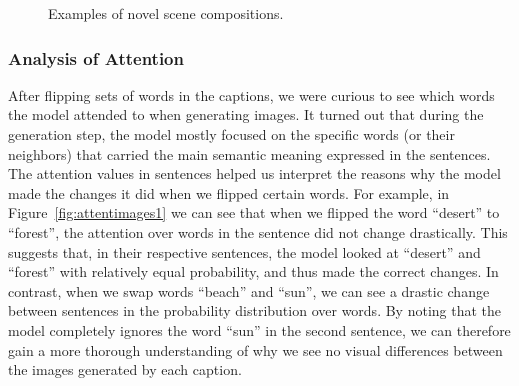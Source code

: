 \documentclass{article} %
\begin{document}
\begin{figure}[!h]
\captionsetup[subfigure]{labelformat=empty}
\begin{center}
\quad
%
\quad
%
\quad
%
\quad
%
\end{center}
\caption{Examples of novel scene compositions.}
\label{fig:genimages4}
\vspace{-0.3cm}
\end{figure}

\subsubsection{Analysis of Attention}

After flipping sets of words in the captions, we were curious to see which words the model attended to when generating images. It turned out that during the generation step, the model mostly focused on the specific words (or their neighbors) that carried the main semantic meaning expressed in the sentences. The attention values in sentences helped us interpret the reasons why the model made the changes it did when we flipped certain words. For example, in Figure~\ref{fig:attentimages1} we can see that when we flipped the word ``desert'' to ``forest'', the attention over words in the sentence did not change drastically. This suggests that, in their respective sentences, the model looked at ``desert'' and ``forest'' with relatively equal probability, and thus made the correct changes. In contrast, when we swap words ``beach'' and ``sun'', we can see a drastic change between sentences in the probability distribution over words. By noting that the model completely ignores the word ``sun'' in the second sentence, we can therefore gain a more thorough understanding of why we see no visual differences between the images generated by each caption.
\end{document}
